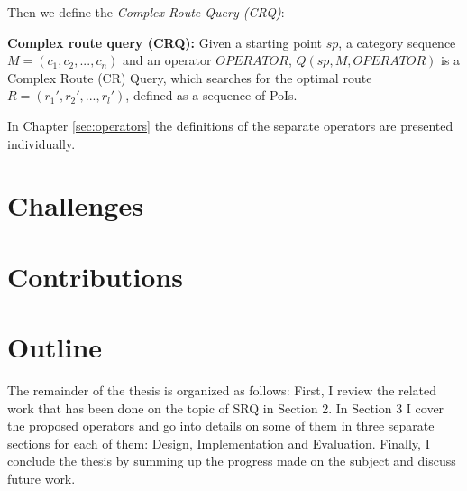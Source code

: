 Then we define the \textit{Complex Route Query (CRQ)}:

\textbf{Complex route query (CRQ):} Given a starting point $sp$, a category sequence $M = (c_1, c_2, ..., c_n)$ and an operator $OPERATOR$, $Q(sp, M, OPERATOR)$ is a Complex Route (CR) Query, which searches for the optimal route $R = (r_1', r_2', ..., r_l')$, defined as a sequence of PoIs.

In Chapter \ref{sec:operators} the definitions of the separate operators are presented individually.

\section{Challenges}

\section{Contributions}

\section{Outline}
The remainder of the thesis is organized as follows: First, I review the related work that has been done on the topic of SRQ in Section 2. In Section 3 I cover the proposed operators and go into details on some of them in three separate sections for each of them: Design, Implementation and Evaluation. Finally, I conclude the thesis by summing up the progress made on the subject and discuss future work.